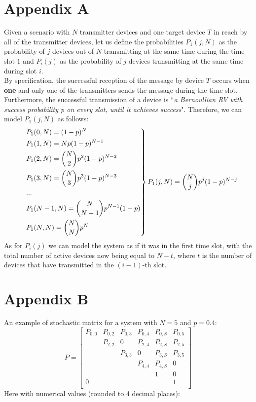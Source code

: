 \section*{Appendix A}
\label{app:a}
Given a scenario with $N$ transmitter devices and one target device $T$ in reach
by all of the transmitter devices, let us define the probabilities $P_{1}(j, N)$
as the probability of $j$ devices out of $N$ transmitting at the same time
during the time slot $1$ and $P_{i}(j)$ as the probability of $j$ devices
transmitting at the same time during slot $i$.\\
By specification, the successful reception of the message by device $T$ occurs
when \textbf{one} and only one of the transmitters sends the message during the
time slot. Furthermore, the successful transmission of a device is
``\textit{a Bernoullian RV with success probability \emph{p} on every slot, until
it achieves success}". Therefore, we can model $P_{1}(j, N)$ as follows:
\[
\begin{drcases}
    &P_{1}(0, N) = (1-p)^{N} \\
    &P_{1}(1, N) = N p(1-p)^{N-1}\\
    &P_{1}(2, N) = {N\choose2}p^{2}(1-p)^{N-2}\\
    &P_{1}(3, N) = {N\choose3}p^{3}(1-p)^{N-3}\\
    &...\\
    &P_{1}(N-1, N) = {N\choose N-1}p^{N-1}(1-p)\\
    &P_{1}(N, N) = {N\choose N}p^{N}\\
\end{drcases}
P_{1}(j, N) = {N\choose j} p^{j} (1-p)^{N-j}
\]
As for $P_{i}(j)$ we can model the system as if it was in the first time slot,
with the total number of active devices now being equal to $N - t$, where
$t$ is the number of devices that have transmitted in the $(i - 1)$-th slot.\\

\newpage
\section*{Appendix B}
\label{app:b}
An example of stochastic matrix for a system with $N = 5$ and $p = 0.4$:
\begin{equation*}
P = 
\begin{bmatrix}
P_{0,0}	& P_{0,2}	& P_{0,3}  	& P_{0, 4}	& P_{0,S}	& P_{0,5} \\
		& P_{2,2}	& 0  		& P_{2, 4}	& P_{2,S}	& P_{2,5} \\
		& 			& P_{3,3}	& 0			& P_{3,S}	& P_{3,5} \\
		& 			& 			& P_{4,4}	& P_{4,S}	& 0\\
		& 			& 			& 			& 1			& 0\\
0		& 			& 		  	& 			& 			& 1\\
\end{bmatrix}
\label{exampleMatrix}
\end{equation*}
Here with numerical values (rounded to 4 decimal places):

